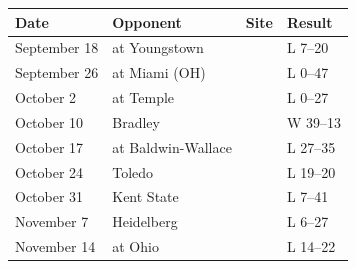 \documentclass{article}
\begin{document}
\begin{tabular}{llll}
\toprule
Date & Opponent & Site & Result \\
\midrule
September 18 & at Youngstown &  & L 7–20 \\
September 26 & at Miami (OH) &  & L 0–47 \\
October 2 & at Temple &  & L 0–27 \\
October 10 & Bradley &  & W 39–13 \\
October 17 & at Baldwin-Wallace &  & L 27–35 \\
October 24 & Toledo &  & L 19–20 \\
October 31 & Kent State &  & L 7–41 \\
November 7 & Heidelberg &  & L 6–27 \\
November 14 & at Ohio &  & L 14–22 \\
\bottomrule
\end{tabular}
\end{document}
